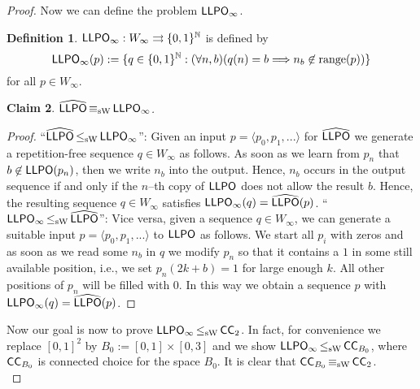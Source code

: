 \documentclass[a4paper]{amsart}
\def\IN{{\mathbb{N}}}
\def\TO{\Longrightarrow}
\def\mto{\rightrightarrows}
\def\range{{\rm range}}
\def\LLPO{\text{\rm\sffamily LLPO}}
\def\ConC{\mbox{\rm\sffamily CC}}
\def\LLPO{\mbox{\rm\sffamily LLPO}}
\def\leqSW{\mathop{\leq_{\mathrm{sW}}}}
\def\equivSW{\mathop{\equiv_{\mathrm{sW}}}}
\newtheorem{localclaim}{Claim}[theorem]
\theoremstyle{definition}
\newtheorem{localdef}[localclaim]{Definition}
\begin{document}
\begin{proof}
Now we can define the problem $\LLPO_\infty$.

\begin{localdef}
$\LLPO_\infty:W_\infty\mto\{0,1\}^\IN$ is defined by
\[\LLPO_\infty(p):=\{q\in\{0,1\}^\IN:(\forall n,b)(q(n)=b\TO n_b\not\in\range(p))\}\]
for all $p\in W_\infty$.
\end{localdef}

\begin{localclaim}
\label{claim:dim2-1}
$\widehat{\LLPO}\equivSW\LLPO_\infty$.
\end{localclaim}
\begin{proof}
``$\widehat{\LLPO}\leqSW\LLPO_\infty$'': Given an input $p=\langle p_0,p_1,...\rangle$ for $\widehat{\LLPO}$ we generate
a repetition-free sequence $q\in W_\infty$ as follows. As soon as we learn from $p_n$ that $b\not\in\LLPO(p_n)$, then we write $n_b$ into the output.
Hence, $n_b$ occurs in the output sequence if and only if the $n$--th copy of $\LLPO$ does not allow the result $b$.
Hence, the resulting sequence $q\in W_\infty$ satisfies $\LLPO_\infty(q)=\widehat{\LLPO}(p)$. 
``$\LLPO_\infty\leqSW\widehat{\LLPO}$'': Vice versa, given a sequence $q\in W_\infty$, we can generate
a suitable input $p=\langle p_0,p_1,...\rangle$ to $\LLPO$ as follows. We start all $p_i$ with zeros and as soon
as we read some $n_b$ in $q$ we modify $p_n$ so that it contains a $1$ in some still available position, i.e., we set $p_n(2k+b)=1$ for large enough $k$. All other positions of $p_n$ will be filled with $0$.
In this way we obtain a sequence $p$ with $\LLPO_\infty(q)=\widehat{\LLPO}(p)$.  
\end{proof}

Now our goal is now to prove $\LLPO_\infty\leqSW\ConC_2$.
In fact, for convenience we replace $[0,1]^2$ by $B_0:=[0,1]\times [0,3]$ and we show
$\LLPO_\infty\leqSW\ConC_{B_0}$, where $\ConC_{B_0}$ is connected choice for the space $B_0$.
It is clear that $\ConC_{B_0}\equivSW\ConC_2$.
\\


\end{proof}
\end{document}
